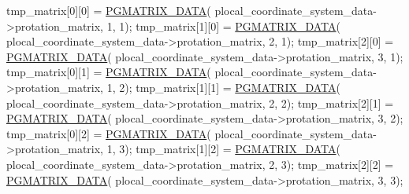 \begin{DoxyCode}
        tmp\_matrix[0][0] = \hyperlink{gmatrix_8h_a7333180c47234295df2bd7b09ac00da8}{PGMATRIX\_DATA}(
      plocal\_coordinate\_system\_data->protation\_matrix, 1, 1);
        tmp\_matrix[1][0] = \hyperlink{gmatrix_8h_a7333180c47234295df2bd7b09ac00da8}{PGMATRIX\_DATA}(
      plocal\_coordinate\_system\_data->protation\_matrix, 2, 1);
        tmp\_matrix[2][0] = \hyperlink{gmatrix_8h_a7333180c47234295df2bd7b09ac00da8}{PGMATRIX\_DATA}(
      plocal\_coordinate\_system\_data->protation\_matrix, 3, 1);
        tmp\_matrix[0][1] = \hyperlink{gmatrix_8h_a7333180c47234295df2bd7b09ac00da8}{PGMATRIX\_DATA}(
      plocal\_coordinate\_system\_data->protation\_matrix, 1, 2);
        tmp\_matrix[1][1] = \hyperlink{gmatrix_8h_a7333180c47234295df2bd7b09ac00da8}{PGMATRIX\_DATA}(
      plocal\_coordinate\_system\_data->protation\_matrix, 2, 2);
        tmp\_matrix[2][1] = \hyperlink{gmatrix_8h_a7333180c47234295df2bd7b09ac00da8}{PGMATRIX\_DATA}(
      plocal\_coordinate\_system\_data->protation\_matrix, 3, 2);
        tmp\_matrix[0][2] = \hyperlink{gmatrix_8h_a7333180c47234295df2bd7b09ac00da8}{PGMATRIX\_DATA}(
      plocal\_coordinate\_system\_data->protation\_matrix, 1, 3);
        tmp\_matrix[1][2] = \hyperlink{gmatrix_8h_a7333180c47234295df2bd7b09ac00da8}{PGMATRIX\_DATA}(
      plocal\_coordinate\_system\_data->protation\_matrix, 2, 3);
        tmp\_matrix[2][2] = \hyperlink{gmatrix_8h_a7333180c47234295df2bd7b09ac00da8}{PGMATRIX\_DATA}(
      plocal\_coordinate\_system\_data->protation\_matrix, 3, 3);


\end{DoxyCode}

